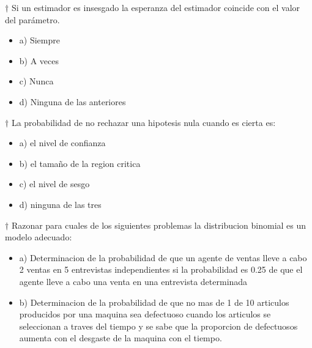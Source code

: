 \documentclass[10pt,a4paper]{article}
\begin{document}
$\dagger$ Si un estimador es insesgado la esperanza del estimador coincide con el valor del parámetro.
\begin{itemize}
	\item a) Siempre
	\item b) A veces
	\item c) Nunca
	\item d) Ninguna de las anteriores 
\end{itemize}

$\dagger$ La probabilidad de no rechazar una hipotesis nula cuando es cierta es:
\begin{itemize}
	\item a) el nivel de confianza
	\item b) el tamaño de la region critica
	\item c) el nivel de sesgo
	\item d) ninguna de las tres
\end{itemize}

$\dagger$ Razonar para cuales de los siguientes problemas la distribucion binomial es un modelo adecuado:
\begin{itemize}
	\item a) Determinacion de la probabilidad de que un agente de ventas lleve a cabo 2 ventas en 5 entrevistas independientes si la probabilidad es 0.25 de que el agente lleve a cabo una venta en una entrevista determinada
	\item b) Determinacion de la probabilidad de que no mas de 1 de 10 articulos producidos por una maquina sea defectuoso cuando los articulos se seleccionan a traves del tiempo y se sabe que la proporcion de defectuosos aumenta con el desgaste de la maquina con el tiempo.
\end{itemize}
\end{document}
